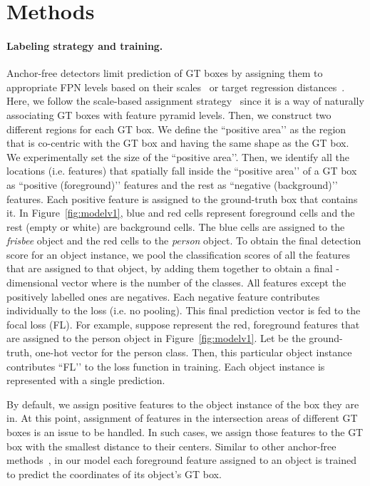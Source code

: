 \documentclass{bmvc2k}
\begin{document}
\section{ Methods}


\paragraph{Labeling strategy and training.} Anchor-free detectors limit prediction of GT boxes by assigning them to appropriate FPN levels based on their  scales~\cite{foveabox} or target regression distances~\cite{fcos}. Here, we follow the scale-based assignment strategy~\cite{foveabox} since it is a way of  naturally associating GT boxes with feature pyramid levels. Then, we construct two different regions for each GT box. We define the ``positive area’’ as the region that is co-centric with the GT box and having the same shape as the GT box. We experimentally set  the size of the ``positive area’’.  Then, we identify all the locations (i.e. features)  that spatially fall inside the ``positive area’’ of a GT box as ``positive (foreground)’’ features  and the rest as ``negative (background)’’ features. Each positive feature  is assigned to the ground-truth box that contains it. In Figure~\ref{fig:modelv1}, blue and red cells represent foreground cells and the rest (empty or white) are background cells. The blue cells are assigned to the \textit{frisbee} object and the red cells to the \textit{person} object. To obtain the final detection score for an object instance, we pool the classification scores of all the features that are assigned to that object, by adding them together to obtain a final -dimensional vector where  is the number of the classes. All features except the positively labelled ones are negatives. Each negative feature contributes individually to the loss (i.e. no pooling). This final prediction vector is fed to the focal loss (FL). For example, suppose  represent the red, foreground features that are assigned to the person object in Figure~\ref{fig:modelv1}. Let  be the ground-truth, one-hot vector for the person class. Then, this particular object instance contributes ``FL’’ to the loss function in training. Each object instance is represented with a single prediction. 




By default, we assign positive features  to the object instance of the box they are in. At this point, assignment of features  in the intersection areas of different GT boxes is an issue to be handled. In such cases, we assign those features to the GT box with the smallest distance to their centers.
Similar to other anchor-free methods~\cite{fcos, fsaf, foveabox, centernet}, in our model each foreground feature assigned to an object is trained to predict the coordinates of its object’s GT  box. 
\end{document}
